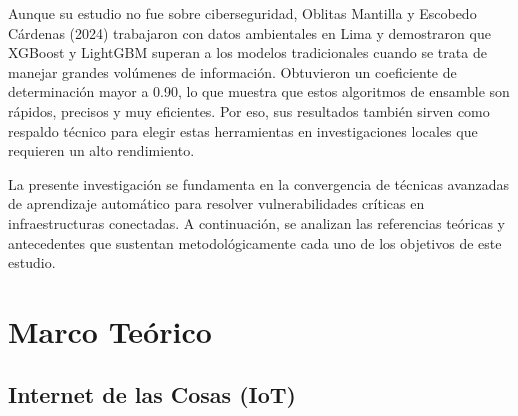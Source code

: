 Aunque su estudio no fue sobre ciberseguridad, Oblitas Mantilla y Escobedo Cárdenas (2024) trabajaron con datos ambientales en Lima y demostraron que XGBoost y LightGBM superan a los modelos tradicionales cuando se trata de manejar grandes volúmenes de información. Obtuvieron un coeficiente de determinación mayor a 0.90, lo que muestra que estos algoritmos de ensamble son rápidos, precisos y muy eficientes. Por eso, sus resultados también sirven como respaldo técnico para elegir estas herramientas en investigaciones locales que requieren un alto rendimiento.

La presente investigación se fundamenta en la convergencia de técnicas avanzadas de aprendizaje automático para resolver vulnerabilidades críticas en infraestructuras conectadas. A continuación, se analizan las referencias teóricas y antecedentes que sustentan metodológicamente cada uno de los objetivos de este estudio.



\section{Marco Teórico}

\subsection{Internet de las Cosas (IoT)}

